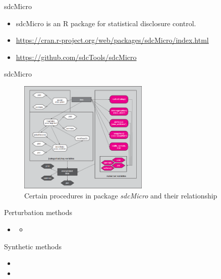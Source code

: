 \documentclass[
  ignorenonframetext,
  aspectratio=169,
]{beamer}
\begin{document}
\begin{frame}{sdcMicro}
\protect\hypertarget{sdcmicro}{}
\begin{itemize}
\item
  sdcMicro is an R package for statistical disclosure control.
\item
  \url{https://cran.r-project.org/web/packages/sdcMicro/index.html}
\item
  \url{https://github.com/sdcTools/sdcMicro}
\end{itemize}
\end{frame}

\begin{frame}{sdcMicro}
\protect\hypertarget{sdcmicro-1}{}
\begin{figure}

{\centering \includegraphics[width=0.55\textwidth,height=\textheight]{gallery/sdcMicro.png}

}

\caption{Certain procedures in package \emph{sdcMicro} and their
relationship}

\end{figure}
\end{frame}

\begin{frame}{Perturbation methods}
\protect\hypertarget{perturbation-methods}{}
\begin{itemize}
\item
  \begin{itemize}
  \item
    \color{red}{sdcMicro}
  \end{itemize}
\end{itemize}
\end{frame}

\begin{frame}{Synthetic methods}
\protect\hypertarget{synthetic-methods}{}
\begin{itemize}
\item
  \color{red}{Introduction to synthetic data}
\item
  \Huge \color{red}{for Jiri/Oscar}
\end{itemize}
\end{frame}
\end{document}
